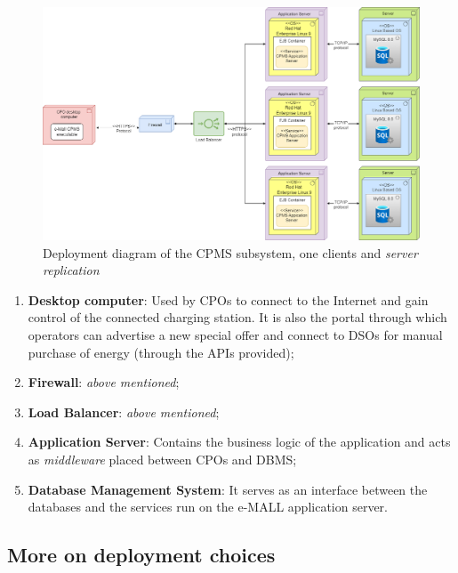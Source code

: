 \documentclass[12pt]{report}
\begin{document}
\begin{figure}[ht]
    \centering
    \includegraphics[width =1.1\textwidth]{assets/high_level_deployment_diagram_CPMS.drawio.png}
    \caption{Deployment diagram of the CPMS subsystem, one clients and \emph{server replication}}
    \label{fig:my_label3}
\end{figure}

\begin{enumerate}[C1:] 
    \item\textbf{Desktop computer}: Used by CPOs to connect to the Internet and gain control of the connected charging station. It is also the portal through which operators can advertise a new special offer and connect to DSOs for manual purchase of energy (through the APIs provided);
    \item\textbf{Firewall}: \emph{above mentioned};
    \item\textbf{Load Balancer}: \emph{above mentioned};
    \item\textbf{Application Server}: Contains the business logic of the application and acts as \emph{middleware} placed between CPOs and DBMS;
    \item\textbf{Database Management System}: It serves as an interface between the databases and the services run on the e-MALL application server.
\end{enumerate}

\subsection{More on deployment choices}
\end{document}
